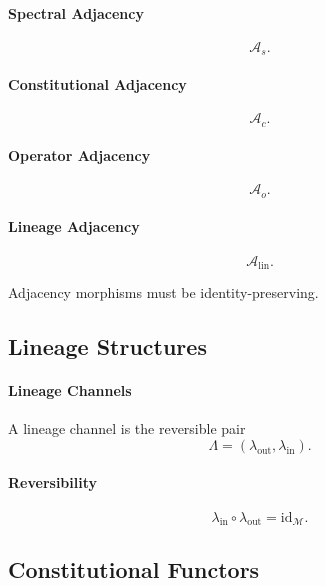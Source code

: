 \paragraph{Spectral Adjacency}
\[
\mathcal{A}_s.
\]

\paragraph{Constitutional Adjacency}
\[
\mathcal{A}_c.
\]

\paragraph{Operator Adjacency}
\[
\mathcal{A}_o.
\]

\paragraph{Lineage Adjacency}
\[
\mathcal{A}_{\mathrm{lin}}.
\]

Adjacency morphisms must be identity-preserving.


\subsection{Lineage Structures}

\paragraph{Lineage Channels}
A lineage channel is the reversible pair
\[
\Lambda = (\lambda_{\mathrm{out}}, \lambda_{\mathrm{in}}).
\]

\paragraph{Reversibility}
\[
\lambda_{\mathrm{in}} \circ \lambda_{\mathrm{out}} = \mathrm{id}_{\mathcal{M}}.
\]


\subsection{Constitutional Functors}

